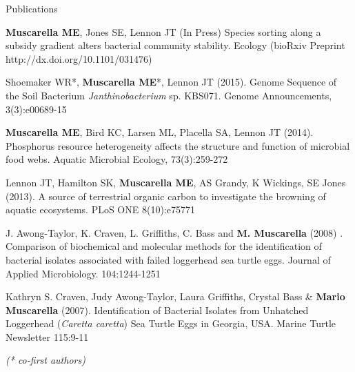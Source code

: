 \documentclass{resume} %
\begin{document}

\begin{rSection}{Publications}

{\bf Muscarella ME}, Jones SE, Lennon JT (In Press) Species sorting along a
subsidy gradient alters bacterial community stability. Ecology (bioRxiv Preprint
http://dx.doi.org/10.1101/031476)

Shoemaker WR*, {\bf Muscarella ME}*, Lennon JT (2015). Genome Sequence of the
Soil Bacterium {\em Janthinobacterium} sp. KBS071. Genome Announcements,
3(3):e00689-15

{\bf Muscarella ME}, Bird KC, Larsen ML, Placella SA, Lennon JT (2014).
Phosphorus resource heterogeneity affects the structure and function of
microbial food webs. Aquatic Microbial Ecology, 73(3):259-272

Lennon JT, Hamilton SK, {\bf Muscarella ME}, AS Grandy, K Wickings, SE Jones
(2013). A source of terrestrial organic carbon to investigate the browning of
aquatic ecosystems. PLoS ONE 8(10):e75771

J. Awong-Taylor, K. Craven, L. Griffiths, C. Bass and {\bf M. Muscarella} (2008)
. Comparison of biochemical and molecular methods for the identification of
bacterial isolates associated with failed loggerhead sea turtle eggs. Journal of
Applied Microbiology. 104:1244-1251

Kathryn S. Craven, Judy Awong-Taylor, Laura Griffiths, Crystal Bass \&
{\bf Mario Muscarella} (2007). Identification of Bacterial Isolates from
Unhatched Loggerhead ({\em Caretta caretta}) Sea Turtle Eggs in Georgia, USA.
Marine Turtle Newsletter 115:9-11

{\em (* co-first authors)}

\end{rSection}
\end{document}

